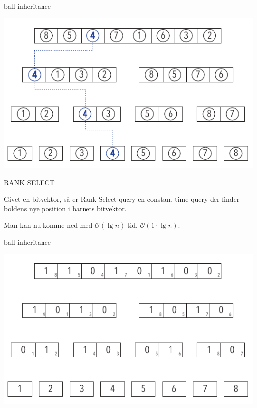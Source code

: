 \documentclass[pdf]{beamer}
\begin{document}
\begin{frame}{ball inheritance}
  \begin{center}
    \includegraphics[scale=1.0]{pictures/bolde_4.pdf}
  \end{center}
\end{frame}


\begin{frame}{RANK SELECT}

  Givet en bitvektor, så er Rank-Select query en constant-time query der finder boldens nye position i barnets bitvektor.

  Man kan nu komme ned med $\mathcal{O}(\lg n)$ tid. $\mathcal{O}(1\cdot\lg n)$.
\end{frame}


\begin{frame}{ball inheritance}
  \begin{center}
    \includegraphics[scale=1.0]{pictures/uden_bolde_med_tal.pdf}
  \end{center}
\end{frame}
\end{document}
